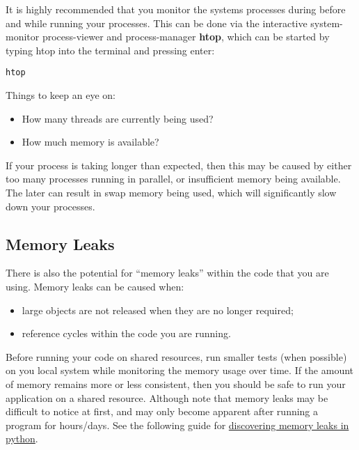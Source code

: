 \documentclass[
]{book}
\providecommand{\tightlist}{%
  \setlength{\itemsep}{0pt}\setlength{\parskip}{0pt}}
\begin{document}
It is highly recommended that you monitor the systems processes during before and while running your processes. This can be done via the interactive system-monitor process-viewer and process-manager \textbf{htop}, which can be started by typing htop into the terminal and pressing enter:

\begin{verbatim}
htop
\end{verbatim}

Things to keep an eye on:

\begin{itemize}
\tightlist
\item
  How many threads are currently being used?
\item
  How much memory is available?
\end{itemize}

If your process is taking longer than expected, then this may be caused by either too many processes running in parallel, or insufficient memory being available. The later can result in swap memory being used, which will significantly slow down your processes.

\hypertarget{memory-leaks}{%
\subsection{Memory Leaks}\label{memory-leaks}}

There is also the potential for ``memory leaks'' within the code that you are using. Memory leaks can be caused when:

\begin{itemize}
\tightlist
\item
  large objects are not released when they are no longer required;
\item
  reference cycles within the code you are running.
\end{itemize}

Before running your code on shared resources, run smaller tests (when possible) on you local system while monitoring the memory usage over time. If the amount of memory remains more or less consistent, then you should be safe to run your application on a shared resource. Although note that memory leaks may be difficult to notice at first, and may only become apparent after running a program for hours/days. See the following guide for \href{https://medium.com/zendesk-engineering/hunting-for-memory-leaks-in-python-applications-6824d0518774}{discovering memory leaks in python}.
\end{document}

